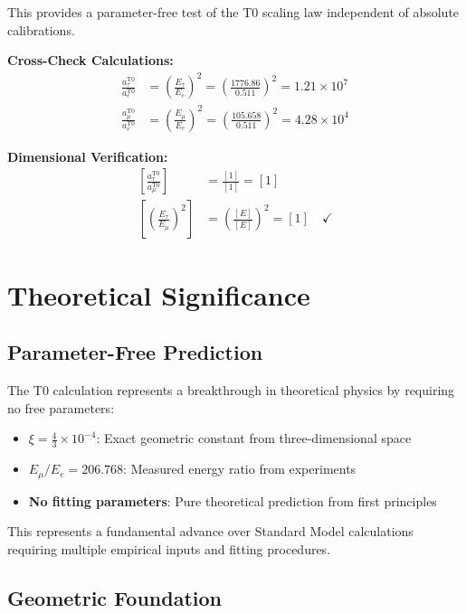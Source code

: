 \documentclass[12pt,a4paper]{report}
\begin{document}
	This provides a parameter-free test of the T0 scaling law independent of absolute calibrations.
	
	\textbf{Cross-Check Calculations:}
	\begin{align}
		\frac{a_\tau^{\text{T0}}}{a_e^{\text{T0}}} &= \left(\frac{E_\tau}{E_e}\right)^2 = \left(\frac{1776.86}{0.511}\right)^2 = 1.21 \times 10^{7} \\
		\frac{a_\mu^{\text{T0}}}{a_e^{\text{T0}}} &= \left(\frac{E_\mu}{E_e}\right)^2 = \left(\frac{105.658}{0.511}\right)^2 = 4.28 \times 10^{4}
	\end{align}
	
	\textbf{Dimensional Verification:}
	\begin{align}
		\left[\frac{a_\tau^{\text{T0}}}{a_\mu^{\text{T0}}}\right] &= \frac{[1]}{[1]} = [1] \\
		\left[\left(\frac{E_\tau}{E_\mu}\right)^2\right] &= \left(\frac{[E]}{[E]}\right)^2 = [1] \quad \checkmark
	\end{align}
	
	\section{Theoretical Significance}
	\label{sec:theoretical_significance}
	
	\subsection{Parameter-Free Prediction}
	\label{subsec:parameter_free}
	
	The T0 calculation represents a breakthrough in theoretical physics by requiring no free parameters:
	\begin{itemize}
		\item \textbf{$\xi = \frac{4}{3} \times 10^{-4}$}: Exact geometric constant from three-dimensional space
		\item \textbf{$E_\mu/E_e = 206.768$}: Measured energy ratio from experiments
		\item \textbf{No fitting parameters}: Pure theoretical prediction from first principles
	\end{itemize}
	
	This represents a fundamental advance over Standard Model calculations requiring multiple empirical inputs and fitting procedures.
	
	\subsection{Geometric Foundation}
	\label{subsec:geometric_foundation}
	
\end{document}
